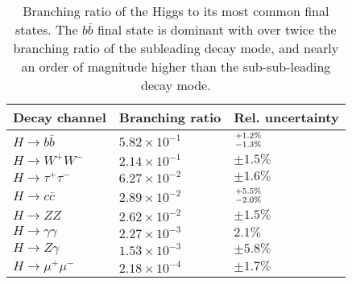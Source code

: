 \begin{table}[tbh]
\begin{center}
\caption{
    Branching ratio of the Higgs to its most common final states.
    The $b \bar{b}$ final state is dominant with over twice the branching ratio of the subleading decay mode,
        and nearly an order of magnitude higher than the sub-sub-leading decay mode\cite{particlephysicsreview2021}.
}
\label{tab:higgsbranching}
\begin{tabular}{|l|l|l|}
    \hline
    Decay channel & Branching ratio & Rel. uncertainty  \\
    \hline
    $ H \to b \bar{b}        $    & $5.82 \times 10^{-1} $    & $ +1.2\% \atop -1.3\% $ \\
    $ H \to W^+ W^-          $    & $2.14 \times 10^{-1} $    & $\pm 1.5\%        $   \\
    $ H \to \tau^+ \tau^-    $    & $6.27 \times 10^{-2} $    & $\pm 1.6\%        $   \\
    $ H \to c \bar{c}        $    & $2.89 \times 10^{-2} $    & $ +5.5\% \atop -2.0\% $ \\
    $ H \to ZZ               $    & $2.62 \times 10^{-2} $    & $\pm 1.5\%        $   \\
    $ H \to \gamma \gamma    $    & $2.27 \times 10^{-3} $    & $    2.1\%        $   \\
    $ H \to Z \gamma         $    & $1.53 \times 10^{-3} $    & $\pm 5.8\%        $  \\
    $ H \to \mu^+ \mu^-      $    & $2.18 \times 10^{-4} $    & $\pm 1.7\%        $  \\
    \hline
\end{tabular}
\end{center}
\end{table}
